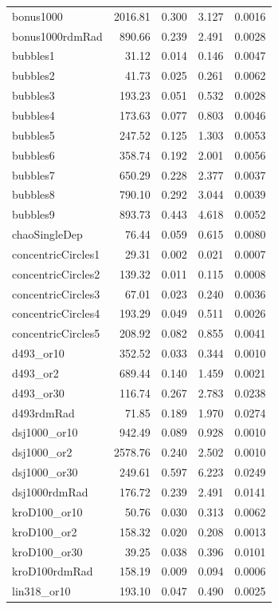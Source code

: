 \documentclass[11pt]{article}
\begin{document}
\begin{longtable}{lrrrr}
bonus1000 & 2016.81 & 0.300 & 3.127 & 0.0016 \\
bonus1000rdmRad & 890.66 & 0.239 & 2.491 & 0.0028 \\
bubbles1 & 31.12 & 0.014 & 0.146 & 0.0047 \\
bubbles2 & 41.73 & 0.025 & 0.261 & 0.0062 \\
bubbles3 & 193.23 & 0.051 & 0.532 & 0.0028 \\
bubbles4 & 173.63 & 0.077 & 0.803 & 0.0046 \\
bubbles5 & 247.52 & 0.125 & 1.303 & 0.0053 \\
bubbles6 & 358.74 & 0.192 & 2.001 & 0.0056 \\
bubbles7 & 650.29 & 0.228 & 2.377 & 0.0037 \\
bubbles8 & 790.10 & 0.292 & 3.044 & 0.0039 \\
bubbles9 & 893.73 & 0.443 & 4.618 & 0.0052 \\
chaoSingleDep & 76.44 & 0.059 & 0.615 & 0.0080 \\
concentricCircles1 & 29.31 & 0.002 & 0.021 & 0.0007 \\
concentricCircles2 & 139.32 & 0.011 & 0.115 & 0.0008 \\
concentricCircles3 & 67.01 & 0.023 & 0.240 & 0.0036 \\
concentricCircles4 & 193.29 & 0.049 & 0.511 & 0.0026 \\
concentricCircles5 & 208.92 & 0.082 & 0.855 & 0.0041 \\
d493\_or10 & 352.52 & 0.033 & 0.344 & 0.0010 \\
d493\_or2 & 689.44 & 0.140 & 1.459 & 0.0021 \\
d493\_or30 & 116.74 & 0.267 & 2.783 & 0.0238 \\
d493rdmRad & 71.85 & 0.189 & 1.970 & 0.0274 \\
dsj1000\_or10 & 942.49 & 0.089 & 0.928 & 0.0010 \\
dsj1000\_or2 & 2578.76 & 0.240 & 2.502 & 0.0010 \\
dsj1000\_or30 & 249.61 & 0.597 & 6.223 & 0.0249 \\
dsj1000rdmRad & 176.72 & 0.239 & 2.491 & 0.0141 \\
kroD100\_or10 & 50.76 & 0.030 & 0.313 & 0.0062 \\
kroD100\_or2 & 158.32 & 0.020 & 0.208 & 0.0013 \\
kroD100\_or30 & 39.25 & 0.038 & 0.396 & 0.0101 \\
kroD100rdmRad & 158.19 & 0.009 & 0.094 & 0.0006 \\
lin318\_or10 & 193.10 & 0.047 & 0.490 & 0.0025 \\

\end{longtable}
\end{document}
